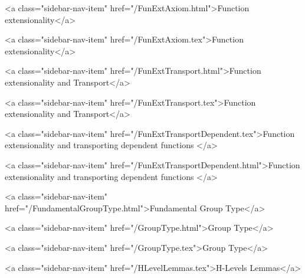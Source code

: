       
    
      
        
          <a class="sidebar-nav-item" href="/FunExtAxiom.html">Function extensionality</a>
        
      
    
      
        
          <a class="sidebar-nav-item" href="/FunExtAxiom.tex">Function extensionality</a>
        
      
    
      
        
          <a class="sidebar-nav-item" href="/FunExtTransport.html">Function extensionality and Transport</a>
        
      
    
      
        
          <a class="sidebar-nav-item" href="/FunExtTransport.tex">Function extensionality and Transport</a>
        
      
    
      
        
          <a class="sidebar-nav-item" href="/FunExtTransportDependent.tex">Function extensionality and transporting dependent functions </a>
        
      
    
      
        
          <a class="sidebar-nav-item" href="/FunExtTransportDependent.html">Function extensionality and transporting dependent functions </a>
        
      
    
      
        
          <a class="sidebar-nav-item" href="/FundamentalGroupType.html">Fundamental Group Type</a>
        
      
    
      
        
          <a class="sidebar-nav-item" href="/GroupType.html">Group Type</a>
        
      
    
      
        
          <a class="sidebar-nav-item" href="/GroupType.tex">Group Type</a>
        
      
    
      
        
          <a class="sidebar-nav-item" href="/HLevelLemmas.tex">H-Levels Lemmas</a>
        
      
    
